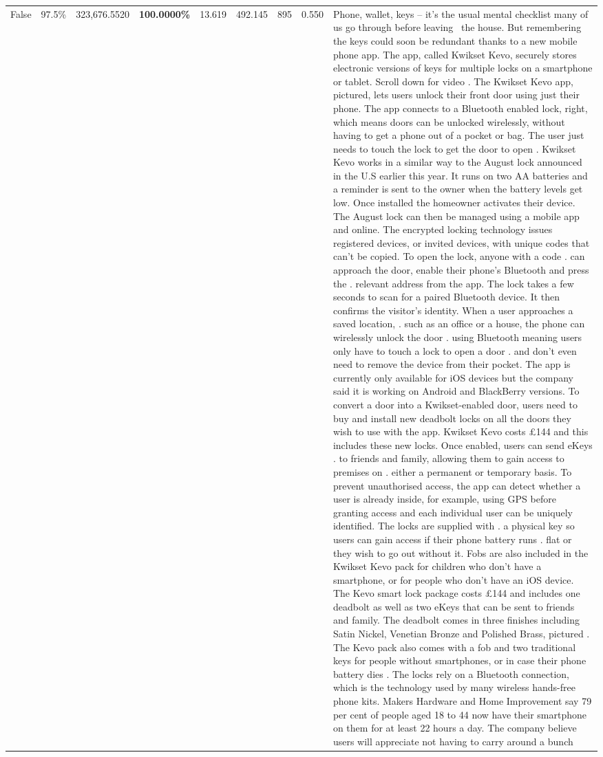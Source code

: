 \begin{table}[H]
\begin{tabular}{lllrlllll}
False & 97.5\% & 323,676.5520 & \bfseries \color{red} 100.0000\% & 13.619 & 492.145 & 895 & 0.550 & Phone, wallet, keys – it’s the usual mental checklist many of us go through before leaving  the house. But remembering the keys could soon be redundant thanks to a new mobile phone app. The app, called Kwikset Kevo, securely stores electronic versions of keys for multiple locks on a smartphone or tablet. Scroll down for video . The Kwikset Kevo app, pictured, lets users unlock their front door using just their phone. The app connects to a Bluetooth enabled lock, right, which means doors can be unlocked wirelessly, without having to get a phone out of a pocket or bag. The user just needs to touch the lock to get the door to open . Kwikset Kevo works in a similar way to the August lock announced in the U.S earlier this year. It runs on two AA batteries and a reminder is sent to the owner when the battery levels get low. Once installed the homeowner activates their device. The August lock can then be managed using a mobile app and online. The encrypted locking technology issues registered devices, or invited devices, with unique codes that can't be copied. To open the lock, anyone with a code . can approach the door, enable their phone's Bluetooth and press the . relevant address from the app. The lock takes a few seconds to scan for a paired Bluetooth device. It then confirms the visitor's identity. When a user approaches a saved location, . such as an office or a house, the phone can wirelessly unlock the door . using Bluetooth meaning users only have to touch a lock to open a door . and don't even need to remove the device from their pocket. The app is currently only available for iOS devices but the company said it is working on Android and BlackBerry versions. To convert a door into a Kwikset-enabled door, users need to buy and install new deadbolt locks on all the doors they wish to use with the app. Kwikset Kevo costs £144 and this includes these new locks. Once enabled, users can send eKeys . to friends and family, allowing them to gain access to premises on . either a permanent or temporary basis. To prevent unauthorised access, the app can detect whether a user is already inside, for example, using GPS before granting access and each individual user can be uniquely identified. The locks are supplied with . a physical key so users can gain access if their phone battery runs . flat or they wish to go out without it. Fobs are also included in the Kwikset Kevo pack for children who don't have a smartphone, or for people who don't have an iOS device. The Kevo smart lock package costs £144 and includes one deadbolt as well as two eKeys that can be sent to friends and family. The deadbolt comes in three finishes including Satin Nickel, Venetian Bronze and Polished Brass, pictured . The Kevo pack also comes with a fob and two traditional keys for people without smartphones, or in case their phone battery dies . The locks rely on a Bluetooth connection, which is the technology used by many wireless hands-free phone kits. Makers Hardware and Home Improvement say 79 per cent of people aged 18 to 44 now have their smartphone on them for at least 22 hours a day. The company believe users will appreciate not having to carry around a bunch 
\end{tabular}
\end{table}
